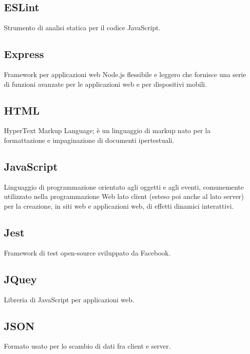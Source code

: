 \documentclass[../manuale_sviluppatore.tex]{subfiles}
\begin{document}
\subsection*{ESLint}
{}
Strumento di analisi statica per il codice JavaScript.

\subsection*{Express}
{}
Framework per applicazioni web Node.js flessibile e leggero che fornisce una serie di funzioni 
avanzate per le applicazioni web e per dispositivi mobili.

\subsection*{HTML}
{}
HyperText Markup Language; è un linguaggio di markup nato per la formattazione e impaginazione di 
documenti ipertestuali.

\subsection*{JavaScript}
{}
Linguaggio di programmazione orientato agli oggetti e agli eventi, comunemente utilizzato nella 
programmazione Web lato client (esteso poi anche al lato server) per la creazione, in siti web e 
applicazioni web, di effetti dinamici interattivi.

\subsection*{Jest}
{}
Framework di test open-source sviluppato da Facebook.

\subsection*{JQuey}
{}
Libreria di JavaScript per applicazioni web.

\subsection*{JSON}
{}
Formato usato per lo scambio di dati fra client e server.
\end{document}
